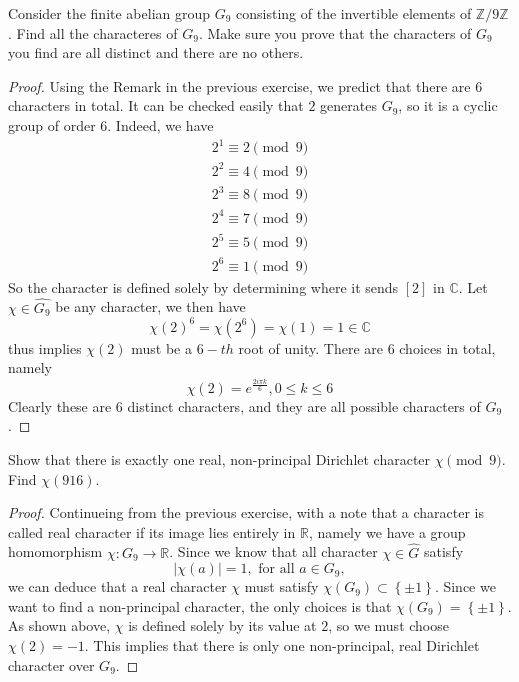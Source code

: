 \documentclass[11pt,letterpaper]{article}
\DeclareMathOperator{\1}{\mathbbm{1}}
\begin{document}
\begin{exercise}
  \label{ex3}
  Consider the finite abelian group $G_9$ consisting of the invertible elements of $\mathbb{Z}/9\mathbb{Z}$. Find all the characteres of $G_9$.
  Make sure you prove that the characters of $G_9$ you find are all distinct and there are no others.
\end{exercise}
\begin{proof}
  Using the Remark in the previous exercise, we predict that there are $6$ characters in total. It can be checked easily that $2$ generates $G_9$, so it is a
  cyclic group of order $6$. Indeed, we have
  \begin{align*}
    2^1 \equiv 2 \pmod 9 \\
    2^2 \equiv 4 \pmod 9 \\
    2^3 \equiv 8 \pmod 9 \\
    2^4 \equiv 7 \pmod 9 \\
    2^5 \equiv 5 \pmod 9 \\
    2^6 \equiv 1 \pmod 9
  \end{align*}
  So the character is defined solely by determining where it sends $[2]$ in $\mathbb{C}$. Let $\chi \in \hat{G_9}$ be
  any character, we then have
  \[\chi(2)^6=\chi(2^6) = \chi(1) = 1 \in \mathbb{C}\]
  thus implies $\chi(2)$ must be a $6-th$ root of unity. There are $6$ choices in total, namely
  \[\chi(2) = e^{\frac{2i\pi k}{6}}, 0 \le k \le 6\]
  Clearly these are 6 distinct characters, and they are all possible characters of $G_9$.
\end{proof}

\begin{exercise}
  Show that there is exactly one real, non-principal Dirichlet character $\chi \pmod 9$. Find $\chi(916)$.
\end{exercise}
\begin{proof}
  Continueing from the previous exercise, with a note that a character is called real character if its image lies entirely in
  $\mathbb{R}$, namely  we have a group homomorphism $\chi\colon G_9 \to \mathbb{R}$. Since we know that all character $\chi \in \hat{G}$ satisfy
  \[|\chi(a)| =1, \text{ for all } a \in G_9,\]
  we can deduce that a real character $\chi$ must satisfy $\chi(G_9) \subset \left\lbrace \pm 1 \right\rbrace$. Since
  we want to find a non-principal character, the only choices is that $\chi(G_9) = \left\lbrace \pm 1\right\rbrace$. As shown
  above, $\chi$ is defined solely by its value at $2$, so we must choose $\chi(2) =-1$. This implies that there is only
  one non-principal, real Dirichlet character over $G_9$.
\end{proof}
\end{document}
